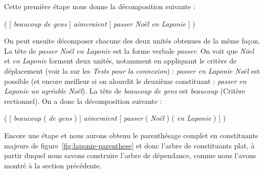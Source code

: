 Cette première étape nous donne la décomposition suivante :

\ea
   ( [ \textit{beaucoup de gens} ] \textit{aimeraient} [ \textit{passer Noël en Laponie} ] )
\z

On peut ensuite décomposer chacune des deux unités obtenues de la même façon. La tête de \textit{passer Noël en Laponie} est la forme verbale \textit{passer}. On voit que \textit{Nöel} et \textit{en Laponie} forment deux unités, notamment en appliquant le critère de déplacement (voir la  sur les \textit{Tests pour la connexion}) : \textit{passer en Laponie Noël} est possible (et encore meilleur si on alourdit le deuxième constituant : \textit{passer en Laponie un agréable Noël}). La tête de \textit{beaucoup de gens} est \textit{beaucoup} (Critère rectionnel). On a donc la décomposition suivante :

\ea
      ( [ \textit{beaucoup}  ( \textit{de gens} ) ]  \textit{aimeraient}  [ \textit{passer}  ( \textit{Noël} ) ( \textit{en Laponie} ) ] )
\z

Encore une étape et nous aurons obtenu le parenthésage complet en constituants majeurs  de figure~\ref{fig:laponie-parenthese} et donc l’arbre de constituants plat, à partir duquel nous savons construire l’arbre de dépendance, comme nous l’avons montré à la section précédente.

